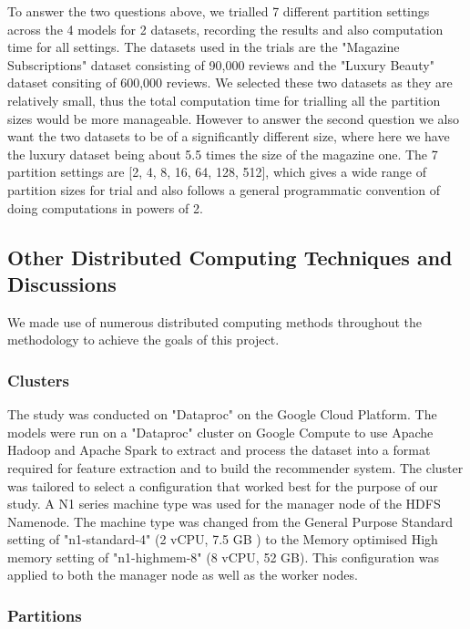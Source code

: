 \documentclass[sigconf,authorversion,nonacm]{acmart}
\begin{document}
To answer the two questions above, we trialled 7 different partition settings across the 4 models for 2 datasets, recording the results and also computation time for all settings. The datasets used in the trials are the "Magazine Subscriptions" dataset consisting of 90,000 reviews and the "Luxury Beauty" dataset consiting of 600,000 reviews. We selected these two datasets as they are relatively small, thus the total computation time for trialling all the partition sizes would be more manageable. However to answer the second question we also want the two datasets to be of a significantly different size, where here we have the luxury dataset being about 5.5 times the size of the magazine one. The 7 partition settings are [2, 4, 8, 16, 64, 128, 512], which gives a wide range of partition sizes for trial and also follows a general programmatic convention of doing computations in powers of 2. 



\subsection{Other Distributed Computing Techniques and Discussions}
    We made use of numerous distributed computing methods throughout the methodology to achieve the goals of this project.

    \subsubsection{Clusters}

    The study was conducted on "Dataproc" on the Google Cloud Platform. The models were run on a "Dataproc" cluster on Google Compute to use Apache Hadoop and Apache Spark to extract and process the dataset into a format required for feature extraction and to build the recommender system. The cluster was tailored to select a configuration that worked best for the purpose of our study. A N1 series machine type was used for the manager node of the HDFS Namenode. The machine type was changed from the General Purpose Standard setting of "n1-standard-4" (2 vCPU, 7.5 GB ) to the Memory optimised High memory setting of "n1-highmem-8" (8 vCPU, 52 GB). This configuration was applied to both the manager node as well as the worker nodes.   

    \subsubsection{Partitions}
\end{document}
